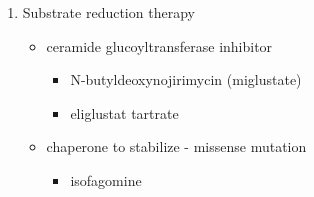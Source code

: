 \documentclass{scrartcl}
\begin{document}
\begin{enumerate}
\begin{enumerate}
\item Substrate reduction therapy
\label{sec:org40f9181}
\begin{itemize}
\item ceramide glucoyltransferase inhibitor
\begin{itemize}
\item N-butyldeoxynojirimycin (miglustate)
\item eliglustat tartrate
\end{itemize}
\item chaperone to stabilize - missense mutation
\begin{itemize}
\item isofagomine
\end{itemize}
\end{itemize}
\end{enumerate}
\end{enumerate}
\end{document}
